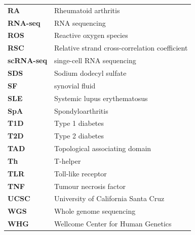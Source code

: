 \begin{longtable}{p{2.5cm}p{12.5cm}}
\textbf{RA} & Rheumatoid arthritis \\
\textbf{RNA-seq} & RNA sequencing\\
\textbf{ROS}  & Reactive oxygen species \\
\textbf{RSC}  & Relative strand cross-correlation coefficient \\
\textbf{scRNA-seq} & singe-cell RNA sequencing \\
\textbf{SDS} & Sodium dodecyl sulfate \\
\textbf{SF} & synovial fluid \\
\textbf{SLE} & Systemic lupus erythematosus\\
\textbf{SpA} & Spondyloarthritis \\
\textbf{T1D} & Type 1 diabetes\\
\textbf{T2D} & Type 2 diabetes \\
\textbf{TAD} & Topological associating domain\\
\textbf{Th} & T-helper \\
\textbf{TLR} & Toll-like receptor\\
\textbf{TNF} & Tumour necrosis factor\\
\textbf{UCSC} & University of California Santa Cruz\\
\textbf{WGS} & Whole genome sequencing\\
\textbf{WHG} & Wellcome Center for Human Genetics\\
\end{longtable}

